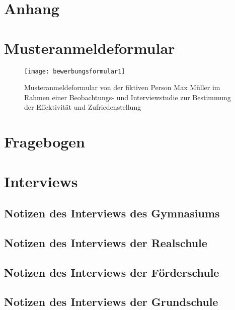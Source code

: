 
\newpage
\section{Anhang}
\appendix
{} %

\section{Musteranmeldeformular}
\label{section-Musteranmeldeformular}
\begin{figure}[H]
    \centering
    \caption{Musteranmeldeformular von der fiktiven Person Max Müller im Rahmen einer Beobachtungs- und Interviewstudie zur Bestimmung der Effektivität und Zufriedenstellung}
    \begin{adjustbox}{height=0.85\textheight, center}
        \texttt{[image: bewerbungsformular1]}
    \end{adjustbox}
    \label{fig:anmeldeformular}
\end{figure}

\section{Fragebogen}
\label{section-fragebogen}


\section{Interviews}
\subsection{Notizen des Interviews des Gymnasiums}
\label{section-InterviewGymnasium}


\subsection{Notizen des Interviews der Realschule}
\label{section-InterviewRealschule}


\subsection{Notizen des Interviews der Förderschule}
\label{section-InterviewFoerderschule}


\subsection{Notizen des Interviews der Grundschule}
\label{section-InterviewGrundschule}


